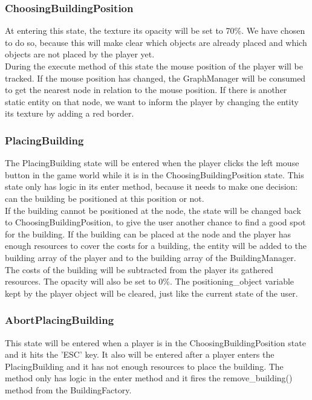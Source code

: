 \subsubsection{ChoosingBuildingPosition}
At entering this state, the texture its opacity will be set to 70\%. We have chosen to do so, because this will make clear which objects are already placed and which objects are not placed by the player yet.\\
During the execute method of this state the mouse position of the player will be tracked. If the mouse position has changed, the GraphManager will be consumed to get the nearest node in relation to the mouse position. If there is another static entity on that node, we want to inform the player by changing the entity its texture by adding a red border.

\subsubsection{PlacingBuilding}
The PlacingBuilding state will be entered when the player clicks the left mouse button in the game world while it is in the ChoosingBuildingPosition state. This state only has logic in its enter method, because it needs to make one decision: can the building be positioned at this position or not.\\
If the building cannot be positioned at the node, the state will be changed back to ChoosingBuildingPosition, to give the user another chance to find a good spot for the building. If the building can be placed at the node and the player has enough resources to cover the costs for a building, the entity will be added to the building array of the player and to the building array of the BuildingManager. The costs of the building will be subtracted from the player its gathered resources. The opacity will also be set to 0\%. The positioning\_object variable kept by the player object will be cleared, just like the current state of the user.

\subsubsection{AbortPlacingBuilding} \label{AbortPlacingBuilding}
This state will be entered when a player is in the ChoosingBuildingPosition state and it hits the 'ESC' key. It also will be entered after a player enters the PlacingBuilding and it has not enough resources to place the building. The method only has logic in the enter method and it fires the remove\_building() method from the BuildingFactory. 

